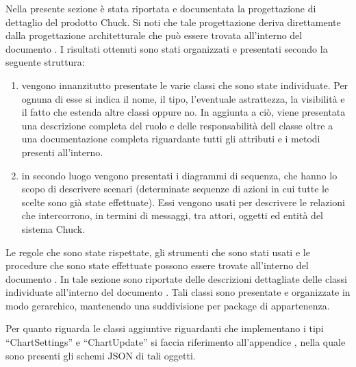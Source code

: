     Nella presente sezione è stata riportata e documentata la progettazione di dettaglio del prodotto Chuck. Si noti che tale progettazione deriva direttamente dalla progettazione architetturale che può essere trovata all'interno del documento . I risultati ottenuti sono stati organizzati e presentati secondo la seguente struttura:
    \begin{enumerate}
        \item vengono innanzitutto presentate le varie classi che sono state individuate. Per ognuna di esse si indica il nome, il tipo, l'eventuale astrattezza, la visibilità e il fatto che estenda altre classi oppure no. In aggiunta a ciò, viene presentata una descrizione completa del ruolo e delle responsabilità dell classe oltre a una documentazione completa riguardante tutti gli attributi e i metodi presenti all'interno.
        \item in secondo luogo vengono presentati i diagrammi di sequenza, che hanno lo scopo di descrivere scenari (determinate sequenze di azioni in cui tutte le scelte sono già state effettuate). Essi vengono usati per descrivere le relazioni che intercorrono, in termini di messaggi, tra attori, oggetti ed entità del sistema Chuck.
    \end{enumerate}
    Le regole che sono state rispettate, gli strumenti che sono stati usati e le procedure che sono state effettuate possono essere trovate all'interno del documento .
        In tale sezione sono riportate delle descrizioni dettagliate delle classi individuate all'interno del documento . Tali classi sono presentate e organizzate in modo gerarchico, mantenendo una suddivisione per package di appartenenza.
        

        Per quanto riguarda le classi aggiuntive riguardanti che implementano i tipi “ChartSettings” e “ChartUpdate” si faccia riferimento all'appendice , nella quale sono presenti gli schemi JSON di tali oggetti.


